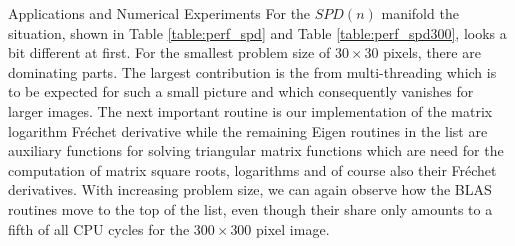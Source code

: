 \begin{chapter}{Applications and Numerical Experiments}
For the $SPD(n)$ manifold the situation, shown in Table \ref{table:perf_spd} and Table \ref{table:perf_spd300}, looks a bit different at first. 
For the smallest problem size of $30\times 30$ pixels, there are dominating parts. The largest contribution is the from multi-threading which is to be expected
for such a small picture and which consequently vanishes for larger images. 
The next important routine is our implementation of the matrix logarithm Fr\'{e}chet derivative while the remaining Eigen routines in the
list are auxiliary functions for solving triangular matrix functions which are need for the computation of matrix square roots, logarithms and of course also their
Fr\'{e}chet derivatives. With increasing problem size, we can again observe how the BLAS routines move to the top of the list, even though their share only amounts 
to a fifth of all CPU cycles for the $300\times 300$ pixel image. \\
\begin{figure}[h!]
    \centering
\end{figure}
\begin{table}[h!]
\centering
\footnotesize
\setlength{\tabcolsep}{3pt}
\end{table}
\end{chapter}
